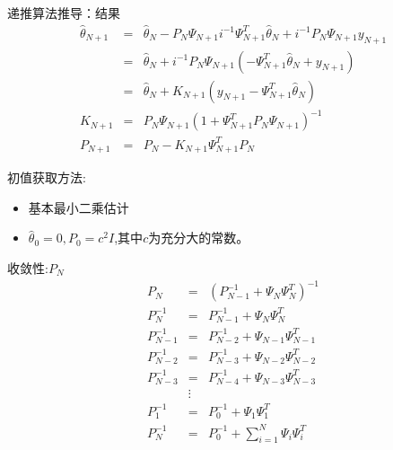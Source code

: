 \begin{frame}{递推算法推导：结果}
\begin{eqnarray*}
\hat\theta_{N+1} &=& \hat\theta_N-P_N\Psi_{N+1}i^{-1}\Psi_{N+1}^T \hat\theta_N +i^{-1}P_N\Psi_{N+1}y_{N+1} \\
&=& \hat\theta_N+i^{-1}P_N\Psi_{N+1}(-\Psi_{N+1}^T \hat\theta_N +y_{N+1}) \\
&=& \hat\theta_N+ K_{N+1}(y_{N+1}-\Psi_{N+1}^T\hat\theta_N) \\
K_{N+1} &=& P_N\Psi_{N+1}(1+\Psi_{N+1}^T P_N \Psi_{N+1})^{-1} \\
P_{N+1} &=& P_N -K_{N+1}\Psi_{N+1}^T P_N 
\end{eqnarray*}

初值获取方法:
\begin{itemize}
\item 基本最小二乘估计
\item $\hat\theta_0=0,P_0=c^2I$,其中$c$为充分大的常数。
\end{itemize}
\end{frame}

\begin{frame}{收敛性:$P_N$}
\begin{eqnarray*}
P_N &=& (P_{N-1}^{-1}+\Psi_N\Psi_N^T)^{-1} \\
P_N^{-1} &=& P_{N-1}^{-1}+\Psi_N\Psi_N^T  \\
P_{N-1}^{-1} &=& P_{N-2}^{-1}+\Psi_{N-1}\Psi_{N-1}^T  \\
P_{N-2}^{-1} &=& P_{N-3}^{-1}+\Psi_{N-2}\Psi_{N-2}^T  \\
P_{N-3}^{-1} &=& P_{N-4}^{-1}+\Psi_{N-3}\Psi_{N-3}^T  \\
& \vdots & \\
P_1^{-1} &=& P_0^{-1}+\Psi_1\Psi_1^T  \\
P_N^{-1} &=& P_0^{-1}+\sum_{i=1}^{N}\Psi_i\Psi_i^T \\
\end{eqnarray*}
\end{frame}

